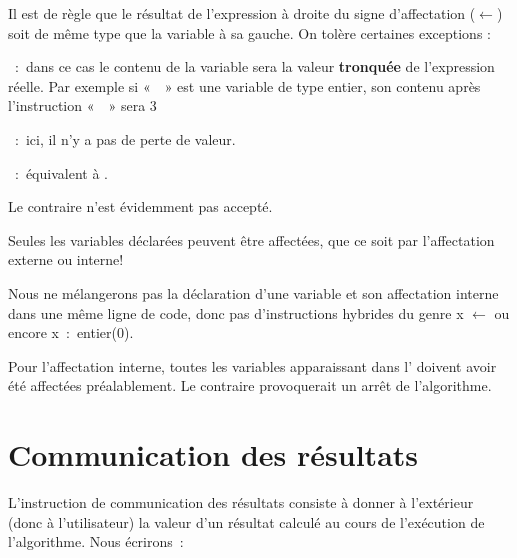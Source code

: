 			\begin{liste}
			\item
				Il est de règle que le résultat de l’expression à droite du signe
				d’affectation ($\gets$) soit de
				même type que la variable à sa gauche. On tolère certaines exceptions
				:
				\begin{liste}
				\item
					~:~dans ce cas le contenu de la variable sera 
                    la valeur \textbf{tronquée} de l’expression réelle. 
					Par exemple si «~~» est
					une variable de type entier, son contenu après l’instruction
					«~~» 
					sera 3
				\item 
					~:~ici, il n’y a pas de perte de valeur.
				\item 
					~:~équivalent à 
                    .
					
					Le contraire n’est évidemment pas accepté.
				\end{liste}
			\item 
				Seules les variables déclarées peuvent être affectées, que ce soit par
				l’affectation externe ou interne!
			\item 
				Nous ne mélangerons pas la déclaration d’une variable et son
				affectation interne dans une même ligne de code, donc pas
				d’instructions hybrides du genre 
				\textsf{x}{ $\gets$ } ou encore 
				\textsf{x~:~entier(0)}.
			\item 
				Pour l’affectation interne, toutes les variables apparaissant dans
				l’ doivent avoir été affectées
				préalablement. Le contraire provoquerait un arrêt de l’algorithme.
			\end{liste}
			
	\section{Communication des résultats}

		L’instruction de communication des résultats consiste à donner à
		l’extérieur (donc à l’utilisateur) la valeur d’un résultat 
		calculé au cours de l’exécution de l’algorithme. Nous écrirons~:

